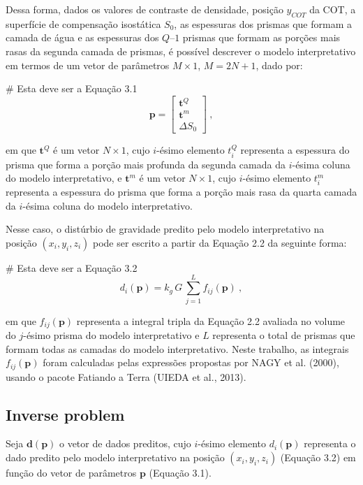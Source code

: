 \documentclass[manuscript]{geophysics}
\begin{document}
Dessa forma, dados os valores de contraste de densidade, posição $y_{COT}$ da COT, a superfície de compensação isostática $S_{0}$, as espessuras dos prismas que formam a camada de água e as espessuras dos $Q – 1$ prismas que formam as porções mais rasas da segunda camada de prismas, é possível descrever o modelo interpretativo em termos de um vetor de parâmetros $M \times 1$, $M = 2N + 1$, dado por:

# Esta deve ser a Equação 3.1
\begin{equation}
\mathbf{p} = \begin{bmatrix}
\mathbf{t}^{Q} \\
\mathbf{t}^{m} \\
\Delta S_{0}
\end{bmatrix} \: ,
\end{equation}

em que $\mathbf{t}^{Q}$ é um vetor $N \times 1$, cujo $i$-ésimo elemento $t^{Q}_{i}$ representa a espessura do prisma que forma a porção mais profunda da segunda camada da $i$-ésima coluna do modelo interpretativo, e $\mathbf{t}^{m}$ é um vetor $N \times 1$, cujo $i$-ésimo elemento $t^{m}_{i}$ representa a espessura do prisma que forma a porção mais rasa da quarta camada da $i$-ésima coluna do modelo interpretativo.

Nesse caso, o distúrbio de gravidade predito pelo modelo interpretativo na posição $(x_{i}, y_{i}, z_{i})$ pode ser escrito a partir da Equação 2.2 da seguinte forma:

# Esta deve ser a Equação 3.2
\begin{equation}
d_{i}(\mathbf{p}) = k_{g} \, G \, \sum_{j = 1}^{L} f_{ij}(\mathbf{p}) \: ,
\end{equation}

em que $f_{ij}(\mathbf{p})$ representa a integral tripla da Equação 2.2 avaliada no volume do $j$-ésimo prisma do modelo interpretativo e $L$ representa o total de prismas que formam todas as camadas do modelo interpretativo. Neste trabalho, as integrais $f_{ij}(\mathbf{p})$ foram calculadas pelas expressões propostas por NAGY et al. (2000), usando o pacote Fatiando a Terra (UIEDA et al., 2013).


\subsection{Inverse problem}


Seja $\mathbf{d}(\mathbf{p})$ o vetor de dados preditos, cujo $i$-ésimo elemento $d_{i}(\mathbf{p})$ representa o dado predito pelo modelo interpretativo na posição $(x_{i}, y_{i}, z_{i})$ (Equação 3.2) em função do vetor de parâmetros $\mathbf{p}$ (Equação 3.1).
\end{document}
